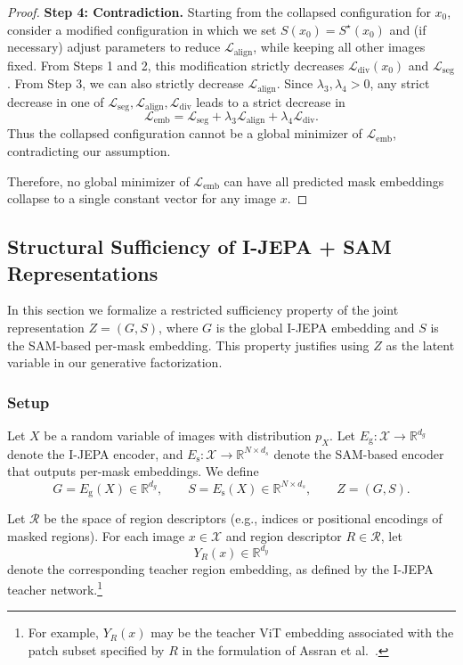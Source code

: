 \documentclass[12pt]{article}
\begin{document}
\begin{proof}
\medskip
\noindent\textbf{Step 4: Contradiction.}
Starting from the collapsed configuration for $x_0$, consider a modified
configuration in which we set $S(x_0) = S^\star(x_0)$ and (if necessary)
adjust parameters to reduce $\mathcal{L}_{\mathrm{align}}$, while keeping
all other images fixed.
From Steps 1 and 2, this modification strictly decreases
$\mathcal{L}_{\mathrm{div}}(x_0)$ and $\mathcal{L}_{\mathrm{seg}}$.
From Step 3, we can also strictly decrease $\mathcal{L}_{\mathrm{align}}$.
Since $\lambda_3,\lambda_4>0$, any strict decrease in one of
$\mathcal{L}_{\mathrm{seg}}, \mathcal{L}_{\mathrm{align}},
\mathcal{L}_{\mathrm{div}}$ leads to a strict decrease in
\[
\mathcal{L}_{\mathrm{emb}}
= \mathcal{L}_{\mathrm{seg}}
+ \lambda_3 \mathcal{L}_{\mathrm{align}}
+ \lambda_4 \mathcal{L}_{\mathrm{div}}.
\]
Thus the collapsed configuration cannot be a global minimizer of
$\mathcal{L}_{\mathrm{emb}}$, contradicting our assumption.

Therefore, no global minimizer of $\mathcal{L}_{\mathrm{emb}}$ can have
all predicted mask embeddings collapse to a single constant vector
for any image $x$.
\end{proof}

\subsection{Structural Sufficiency of I-JEPA + SAM Representations}

In this section we formalize a restricted sufficiency property of the
joint representation \(Z = (G,S)\), where \(G\) is the global I-JEPA
embedding and \(S\) is the SAM-based per-mask embedding. This property
justifies using \(Z\) as the latent variable in our generative
factorization.

\subsubsection{Setup}

Let \(X\) be a random variable of images with distribution \(p_X\).
Let \(E_{\mathrm{g}} : \mathcal{X} \to \mathbb{R}^{d_g}\) denote the
I-JEPA encoder, and \(E_{\mathrm{s}} : \mathcal{X} \to \mathbb{R}^{N \times d_s}\)
denote the SAM-based encoder that outputs per-mask embeddings. We define
\[
G = E_{\mathrm{g}}(X) \in \mathbb{R}^{d_g}, \qquad
S = E_{\mathrm{s}}(X) \in \mathbb{R}^{N \times d_s}, \qquad
Z = (G,S).
\]

Let \(\mathcal{R}\) be the space of region descriptors (e.g., indices or
positional encodings of masked regions). For each image \(x \in \mathcal{X}\)
and region descriptor \(R \in \mathcal{R}\), let
\[
Y_R(x) \in \mathbb{R}^{d_y}
\]
denote the corresponding teacher region embedding, as defined by the
I-JEPA teacher network.\footnote{For example, \(Y_R(x)\) may be the
teacher ViT embedding associated with the patch subset specified by \(R\)
in the formulation of Assran et al.~\cite{assran2023ijepa}.}
\end{document}
